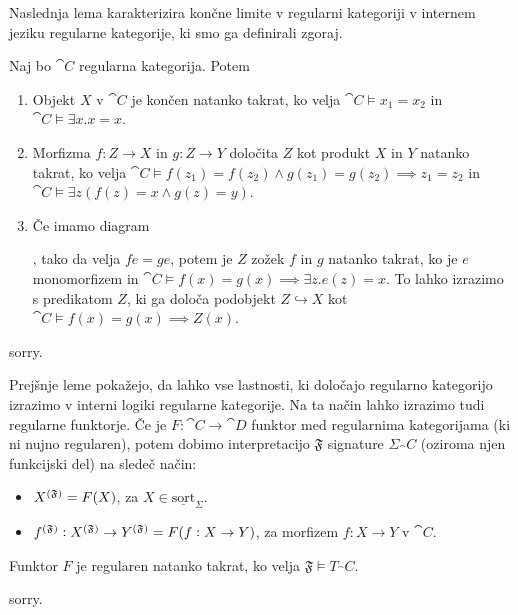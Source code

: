 \documentclass[../kategoricna_logika.tex]{subfiles}
\begin{document}
Naslednja lema karakterizira končne limite v regularni kategoriji v internem jeziku regularne kategorije, ki smo ga definirali zgoraj.
\begin{lema}
  Naj bo $\cat{C}$ regularna kategorija. Potem
  \begin{enumerate}[label=(\roman*)]
    \item Objekt $X$ v $\cat{C}$ je končen natanko takrat, ko velja $\cat{C} \models x_1 = x_2$ in $\cat{C} \models \exists x . x=x$.
    \item Morfizma $f : Z \to X$ in $g : Z \to Y$ določita $Z$ kot produkt $X$ in $Y$ natanko takrat,
    ko velja $\cat{C} \models f(z_1) = f(z_2) \wedge g(z_1) = g(z_2) \implies z_1 = z_2$ in 
    $\cat{C} \models \exists z(f(z) = x \wedge g(z) = y)$.
    \item Če imamo diagram ,
    tako da velja $f e = g e$, potem je $Z$ zožek $f$ in $g$ natanko takrat, ko je $e$ monomorfizem in
    $\cat{C} \models f(x) = g(x) \implies \exists z . e(z) = x$. To lahko izrazimo s predikatom $Z$,
    ki ga določa podobjekt $Z \hookrightarrow X$ kot $\cat{C} \models f(x) = g(x) \implies Z(x)$.
  \end{enumerate}
\end{lema}
\begin{dokaz}
  sorry.
\end{dokaz}

\noindent
Prejšnje leme pokažejo, da lahko vse lastnosti, ki določajo regularno kategorijo izrazimo v interni logiki regularne kategorije.
Na ta način lahko izrazimo tudi regularne funktorje.
Če je $F : \cat{C} \to \cat{D}$ funktor med regularnima kategorijama (ki ni nujno regularen), potem dobimo interpretacijo $\mathfrak{F}$ signature $\Sigma_\cat{C}$ (oziroma njen funkcijski del) na sledeč način:
\begin{itemize}
  \item $\interp[\mathfrak{F}]{X} = F(X)$, za $X \in \underline{\mathrm{sort}}_{\Sigma}$.
  \item $\interp[\mathfrak{F}]{f} : \interp[\mathfrak{F}]{X} \to \interp[\mathfrak{F}]{Y} = F(f : X \to Y)$, za morfizem $f: X \to Y$ v $\cat{C}$.
\end{itemize}
\begin{lema}
  Funktor $F$ je regularen natanko takrat, ko velja $\mathfrak{F} \models T_\cat{C}$.
\end{lema}
\begin{dokaz}
  sorry.
\end{dokaz}
%
\end{document}
